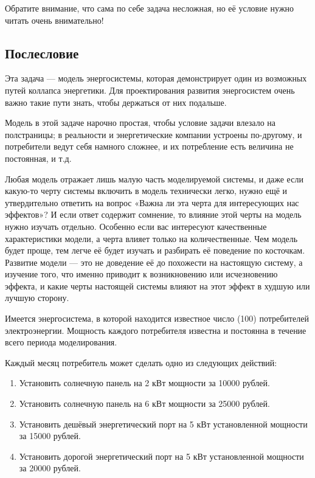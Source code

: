 
Обратите внимание, что сама по себе задача несложная, но её условие нужно читать очень внимательно!

\subsection*{Послесловие}

Эта задача — модель энергосистемы, которая демонстрирует один из возможных путей коллапса энергетики. Для проектирования развития энергосистем очень важно такие пути знать, чтобы держаться от них подальше.

Модель в этой задаче нарочно простая, чтобы условие задачи влезало на полстраницы; в реальности и энергетические компании устроены по-другому, и потребители ведут себя намного сложнее, и их потребление есть величина не постоянная, и т.д.

Любая модель отражает лишь малую часть моделируемой системы, и даже если какую-то черту системы включить в модель технически легко, нужно ещё и утвердительно ответить на вопрос «Важна ли эта черта для интересующих нас эффектов»? И если ответ содержит сомнение, то влияние этой черты на модель нужно изучать отдельно. Особенно если вас интересуют качественные характеристики модели, а черта влияет только на количественные. Чем модель будет проще, тем легче её будет изучать и разбирать её поведение по косточкам. Развитие модели — это не доведение её до похожести на настоящую систему, а изучение того, что именно приводит к возникновению или исчезновению эффекта, и какие черты настоящей системы влияют на этот эффект в худшую или лучшую сторону.

Имеется энергосистема, в которой находится известное число (100) потребителей электроэнергии.
Мощность каждого потребителя известна и постоянна в течение всего периода моделирования.

Каждый месяц потребитель может сделать одно из следующих действий:

\begin{enumerate}
    \item Установить солнечную панель на 2 кВт мощности за 10000 рублей.
    \item Установить солнечную панель на 6 кВт мощности за 25000 рублей.
    \item Установить дешёвый энергетический порт на 5 кВт установленной мощности за 15000 рублей.
    \item Установить дорогой энергетический порт на 5 кВт установленной мощности за 20000 рублей.    
\end{enumerate}

